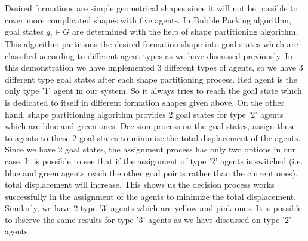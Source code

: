 Desired formations are simple geometrical shapes since it will not be possible to cover more complicated shapes with five agents. In Bubble Packing algorithm, goal states $g_i \in G$ are determined with the help of shape partitioning algorithm. This algorithm partitions the desired formation shape into goal states which are classified according to different agent types as we have discussed previously. In this demonstration we have implemented 3 different types of agents, so we have 3 different type goal states after each shape partitioning process. Red agent is the only type '1' agent in our system. So it always tries to reach the goal state which is dedicated to itself in different formation shapes given above. On the other hand, shape partitioning algorithm provides 2 goal states for type '2' agents which are blue and green ones. Decision process on the goal states, assign these to agents to these 2 goal states to minimize the total displacement of the agents. Since we have 2 goal states, the assignment process has only two options in our case. It is possible to see that if the assignment of type '2' agents is switched (i.e. blue and green agents reach the other goal points rather than the current ones), total displacement will increase. This shows us the decision process works successfully in the assignment of the agents to minimize the total displacement. Similarly, we have 2 type '3' agents which are yellow and pink ones. It is possible to ibserve the same results for type '3' agents as we have discussed on type '2' agents.